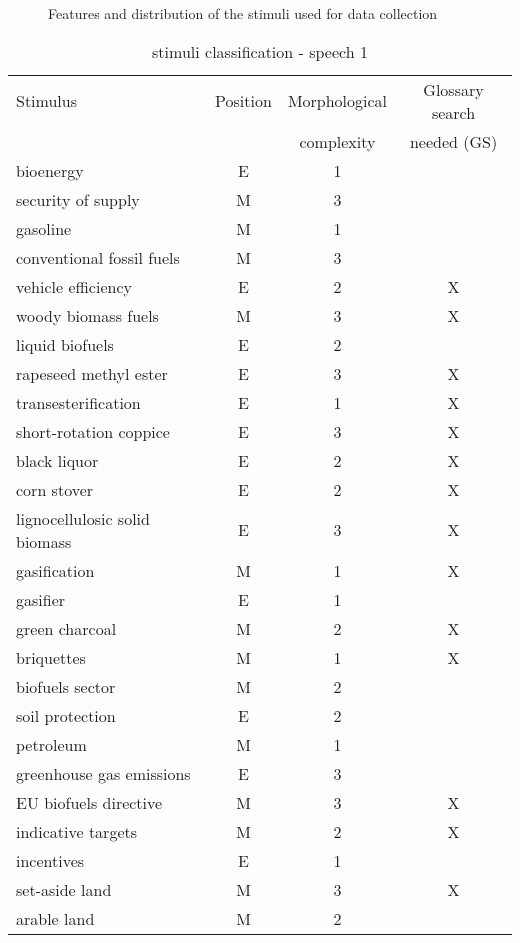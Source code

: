\documentclass[output=paper]{langsci/langscibook}
\begin{document}
\begin{figure}
\caption{Features and distribution of the stimuli used for data collection\label{fig:prandi:8}}
\end{figure}

 

\begin{table}\footnotesize
	\caption{stimuli classification - speech 1\label{tab:prandi:1}}
\begin{tabularx}{\linewidth}{Xccc}
\lsptoprule
{Stimulus} & {Position} & {Morphological} & {Glossary search}\\
		   &            &  complexity      & needed (GS)\\\midrule
bioenergy & E & 1 & \\
security of supply & M & 3 & \\
gasoline & M & 1 & \\
conventional fossil fuels & M & 3 & \\
vehicle efficiency & E & 2 & X\\
woody biomass fuels & M & 3 & X\\
liquid biofuels & E & 2 & \\
rapeseed methyl ester & E & 3 & X\\
transesterification & E & 1 & X\\
short-rotation coppice & E & 3 & X\\
black liquor & E & 2 & X\\
corn stover & E & 2 & X\\
lignocellulosic solid biomass & E & 3 & X\\
gasification & M & 1 & X\\
gasifier & E & 1 & \\
green charcoal & M & 2 & X\\
briquettes & M & 1 & X\\
biofuels sector & M & 2 & \\
soil protection & E & 2 & \\
petroleum & M & 1 & \\
greenhouse gas emissions & E & 3 & \\
EU biofuels directive & M & 3 & X\\
indicative targets & M & 2 & X\\
incentives & E & 1 & \\
set-aside land & M & 3 & X\\
arable land & M & 2 & \\

\end{tabularx}
\end{table}
\end{document}
